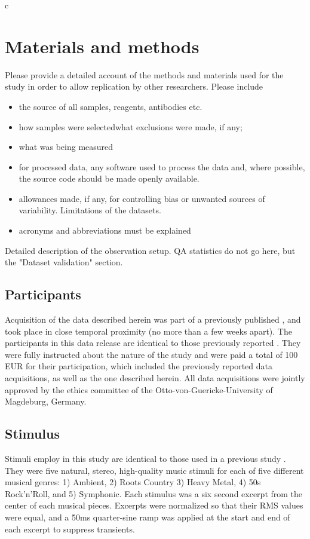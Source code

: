 c\section*{Materials and methods} 
Please provide a detailed account of the methods and materials used for the study in order to allow replication by other researchers.
Please include \begin{itemize}
\item 
the source of all samples, reagents, antibodies etc.
\item 
 how samples were selectedwhat exclusions were made, if any;
\item 
what was being measured
\item 
for processed data, any software used to process the data and, where possible, the source code should be made openly available.\item 

allowances made, if any, for controlling bias or unwanted sources of variability.
Limitations of the datasets.\item 

acronyms and abbreviations must be explained
\end{itemize}

Detailed description of the observation setup. QA statistics do not go here, but the "Dataset validation" section.

\subsection*{Participants}

Acquisition of the data described herein was part of a previously published
\cite{Hanke_2014}, and took place in close temporal proximity (no more than a
few weeks apart). The participants in this data release are identical to those
previously reported \cite{Hanke_2014}.  They were fully instructed about the
nature of the study and were paid a total of 100 EUR for their participation,
which included the previously reported data acquisitions, as well as the one
described herein. All data acquisitions were jointly approved by the ethics
committee of the Otto-von-Guericke-University of Magdeburg, Germany.


\subsection*{Stimulus}

Stimuli employ in this study are identical to those used in a previous study
\cite[for details refer to]{Casey_2012}. They were five natural, stereo,
high-quality music stimuli for each of five different musical genres: 1)
Ambient, 2) Roots Country 3) Heavy Metal, 4) 50s Rock'n'Roll, and 5) Symphonic.
Each stimulus was a six second excerpt from the center of each musical pieces.
Excerpts were normalized so that their RMS values were equal, and a 50ms
quarter-sine ramp was applied at the start and end of each excerpt to suppress
transients.

